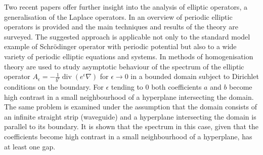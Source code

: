 Two recent papers offer further insight into the analysis of elliptic operators, a generalisation of the Laplace operators. In \cite{kuchment2016overview} an overview of periodic elliptic operators is provided and the main techniques and results of the theory are surveyed. The suggested approach is applicable not only to the standard model example of Schrödinger operator with periodic potential but also to a wide variety of periodic elliptic equations and systems. In \cite{khrabustovskyi2016spectral} methods of homogenisation theory are used to study asymptotic behaviour of the spectrum of the elliptic operator $A_{\epsilon} = - \frac{1}{b^{\epsilon}} \operatorname{div}(e^{\epsilon} \nabla)$ for $\epsilon \rightarrow 0$ in a bounded domain subject to Dirichlet conditions on the boundary. For $\epsilon$ tending to $0$ both coefficients $a$ and $b$ become high contrast in a small neighbourhood of a hyperplane intersecting the domain. The same problem is examined under the assumption that the domain consists of an infinite straight strip (waveguide) and a hyperplane intersecting the domain is parallel to its boundary. It is shown that the spectrum in this case, given that the coefficients become high contrast in a small neighbourhood of a hyperplane, has at least one gap.